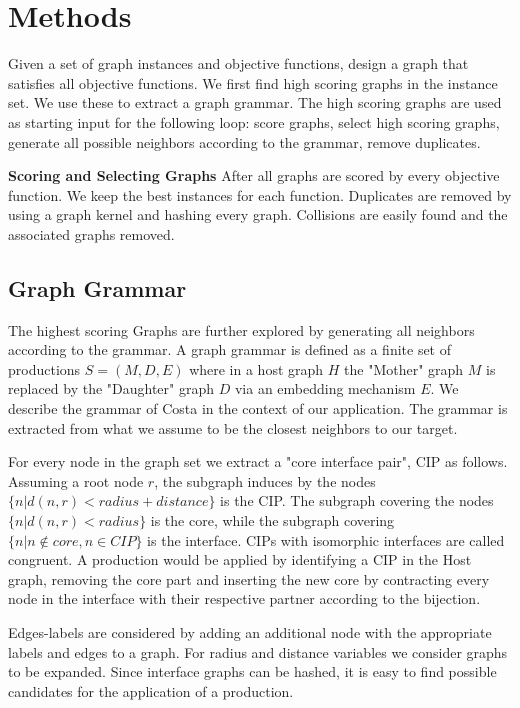 \documentclass{esannV2}
\begin{document}

\section{Methods}
Given a set of graph instances and objective functions, 
design a graph that satisfies all objective functions. 
We first find high scoring graphs in the instance set. We use these to extract a graph grammar. 
The high scoring graphs are used as starting input for the following loop: 
score graphs, 
select high scoring graphs, 
generate all possible neighbors according to the grammar, 
remove duplicates.

\textbf{Scoring and Selecting Graphs}
After all graphs are scored by every objective function. We keep the best instances for 
each function.  
Duplicates are removed by using a graph kernel and hashing every graph. 
Collisions are easily found and the associated graphs removed.

\subsection{Graph Grammar}
The highest scoring Graphs are further explored by generating all neighbors according to 
the grammar. A graph grammar is defined as a finite set of productions $S=(M,D,E)$ where in 
a host graph $H$ the "Mother" graph $M$ is replaced by the "Daughter" graph $D$ via an 
embedding mechanism $E$. We describe the grammar of Costa \cite{costa16gl} in the context of our application.
The grammar is extracted from what we assume to be the closest neighbors to our target.

For every node in the graph set we extract a "core interface pair", CIP as follows.
Assuming a root node $r$, 
the subgraph induces by the nodes $\{ n | d(n,r) < radius+distance \}$ is the CIP.
The subgraph covering the nodes $\{ n | d(n,r) < radius \}$ is the core, while the subgraph covering
$\{ n | n \notin core , n \in CIP \}$ is the interface.
CIPs with isomorphic interfaces are called congruent.
A production would be applied by identifying a CIP in the Host graph, 
removing the core part and inserting the 
new core by contracting every node in the interface 
with their respective partner according to the bijection.

Edges-labels are considered by adding an additional node with the appropriate labels and edges to
a graph. For radius and distance variables we consider graphs to be expanded.
Since interface graphs can be hashed, it is easy to find possible
candidates for the application of a production. 
\end{document}
